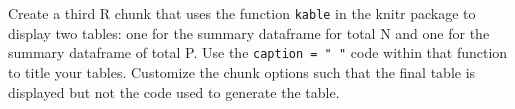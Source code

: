 \documentclass[]{article}
\newenvironment{Shaded}{\begin{snugshade}}{\end{snugshade}}
\newcommand{\KeywordTok}[1]{\textcolor[rgb]{0.13,0.29,0.53}{\textbf{#1}}}
\newcommand{\DataTypeTok}[1]{\textcolor[rgb]{0.13,0.29,0.53}{#1}}
\newcommand{\StringTok}[1]{\textcolor[rgb]{0.31,0.60,0.02}{#1}}
\newcommand{\OperatorTok}[1]{\textcolor[rgb]{0.81,0.36,0.00}{\textbf{#1}}}
\newcommand{\NormalTok}[1]{#1}
\begin{document}
\begin{Shaded}
\end{Shaded}

Create a third R chunk that uses the function \texttt{kable} in the
knitr package to display two tables: one for the summary dataframe for
total N and one for the summary dataframe of total P. Use the
\texttt{caption\ =\ "\ "} code within that function to title your
tables. Customize the chunk options such that the final table is
displayed but not the code used to generate the table.
\end{document}
